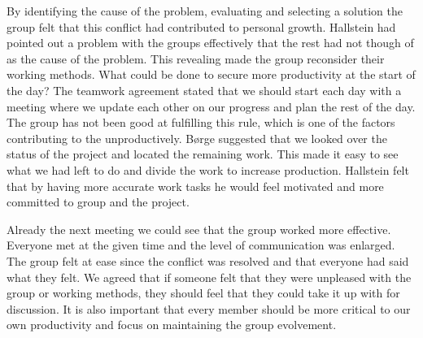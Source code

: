 By identifying the cause of the problem, evaluating and selecting a solution the group felt that this conflict had contributed to personal growth. Hallstein had pointed out a problem with the groups effectively that the rest had not though of as the cause of the problem. This revealing made the group reconsider their working methods. What could be done to secure more productivity at the start of the day? The teamwork agreement stated that we should start each day with a meeting where we update each other on our progress and plan the rest of the day. The group has not been good at fulfilling this rule, which is one of the factors contributing to the unproductively. Børge suggested that we looked over the status of the project and located the remaining work. This made it easy to see what we had left to do and divide the work to increase production. Hallstein felt that by having more accurate work tasks he would feel motivated and more committed to group and the project.  

Already the next meeting we could see that the group worked more effective. Everyone met at the given time and the level of communication was enlarged. The group felt at ease since the conflict was resolved and that everyone had said what they felt. We agreed that if someone felt that they were unpleased with the group or working methods, they should feel that they could take it up with for discussion.  It is also important that every member should be more critical to our own productivity and focus on maintaining the group evolvement.  
